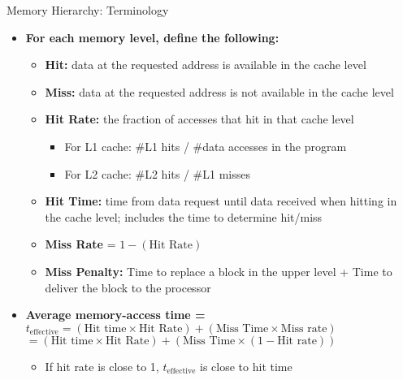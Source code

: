 \documentclass[aspectratio=169,12pt]{beamer}
\begin{document}
\begin{frame}{Memory Hierarchy: Terminology}
\begin{itemize}
  \item \textbf{For each memory level, define the following:}
  \begin{itemize}
    \item \textcolor{green!60!black}{\textbf{Hit:}} data at the requested address is available in the cache level
    \item \textcolor{green!60!black}{\textbf{Miss:}} data at the requested address is not available in the cache level
    \item \textcolor{green!60!black}{\textbf{Hit Rate:}} the fraction of accesses that hit in that cache level
    \begin{itemize}
      \item For L1 cache: \#L1 hits / \#data accesses in the program
      \item For L2 cache: \#L2 hits / \#L1 misses
    \end{itemize}
    \item \textcolor{green!60!black}{\textbf{Hit Time:}} time from data request until data received when hitting in the cache level; includes the time to determine hit/miss
    \item \textcolor{green!60!black}{\textbf{Miss Rate}} = $1 - (\text{Hit Rate})$
    \item \textcolor{green!60!black}{\textbf{Miss Penalty:}} Time to replace a block in the upper level + Time to deliver the block to the processor
  \end{itemize}
  
  \vspace{0.3cm}
  
  \item \textbf{Average memory-access time =}\\
  \hspace{1cm} $t_{\text{effective}} = (\text{Hit time} \times \text{Hit Rate}) + (\text{Miss Time} \times \text{Miss rate})$\\
  \hspace{2.2cm} $= (\text{Hit time} \times \text{Hit Rate}) + (\text{Miss Time} \times (1-\text{Hit rate}))$
  \begin{itemize}
    \item If hit rate is close to 1, $t_{\text{effective}}$ is close to hit time
  \end{itemize}
\end{itemize}
\end{frame}
\end{document}
